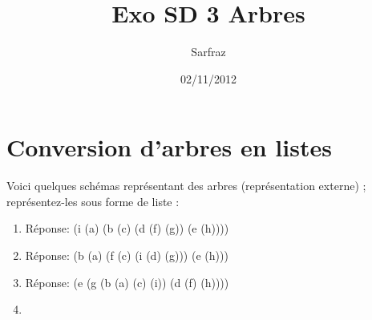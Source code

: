 \documentclass[a4paper, 11pt]{article}
\title{Exo SD 3 Arbres}
\author{Sarfraz \bsc{kapasi}}
\date{02/11/2012}
\begin{document}
%
\maketitle
%
\section{Conversion d'arbres en listes}
Voici quelques schémas représentant des arbres (représentation externe) ; représentez-les sous forme de liste :
\begin{enumerate}
  \item {}
Réponse: (i (a) (b (c) (d (f) (g)) (e (h))))
  \item {}
Réponse: (b (a) (f (c) (i (d) (g))) (e (h)))
  \item {}
Réponse: (e (g (b (a) (c) (i)) (d (f) (h))))
  \item {}

\end{enumerate}
\end{document}
